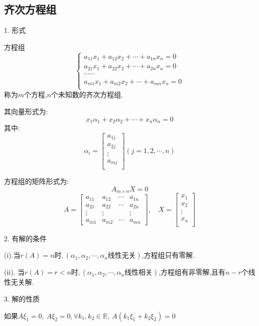 \subsection{齐次方程组}
\begin{definition}[齐次方程组]
	1. 形式
	
	方程组
	$$\left\lbrace 
	\begin{array}{l}
		a_{11}x_{1}+a_{12}x_{2}+\cdots+a_{1n}x_{n}=0\\
		a_{21}x_{1}+a_{22}x_{2}+\cdots+a_{2n}x_{n}=0\\
		\cdots\cdots\\
		a_{m1}x_{1}+a_{m2}x_{2}+\cdots+a_{mn}x_{n}=0\\
	\end{array}
	\right. $$
	称为$m$个方程,$n$个未知数的齐次方程组.
	
	其向量形式为:  
	$$x_{1}\alpha_{1}+x_{2}\alpha_{2}+\cdots+x_{n}\alpha_{n}=0$$
	其中:  
	$$\alpha_{i}=\left[ \begin{matrix}
		a_{1j}\\
		a_{2j}\\
		\vdots\\
		a_{mj}\\
	\end{matrix}\right](j=1,2,\cdots,n) $$
	
	方程组的矩阵形式为:  
	$$A_{m\times n}X=0$$
	$$A=\left[
	\begin{matrix}
		a_{11}&a_{12}&\cdots&a_{1n}\\
		a_{21}&a_{22}&\cdots&a_{2n}\\
		\vdots&\vdots& &\vdots\\
		a_{m1}&a_{m2}&\cdots&a_{mn}
	\end{matrix}
	\right],\quad X=\left[ \begin{matrix}
		x_{1}\\
		x_{2}\\
		\vdots\\
		x_{n}\\
	\end{matrix}\right]$$
	
	2. 有解的条件
	
	(i).当$r(A)=n\text{时},(\alpha_{1},\alpha_{2},\cdots,\alpha_{n}\text{线性无关})$,方程组只有零解.
	
	(ii). 当$r(A)=r<n\text{时},(\alpha_{1},\alpha_{2},\cdots,\alpha_{n}\text{线性相关})$,方程组有非零解,且有$n-r$个线性无关解.
	
	3. 解的性质
	
	如果$A\xi_{1}=0,\ A\xi_{2}=0, \forall k_{1},k_{2}\in \mathbb{R},\ A(k_{1}\xi_{1}+k_{2}\xi_{2})=0 $
	

\end{definition}
